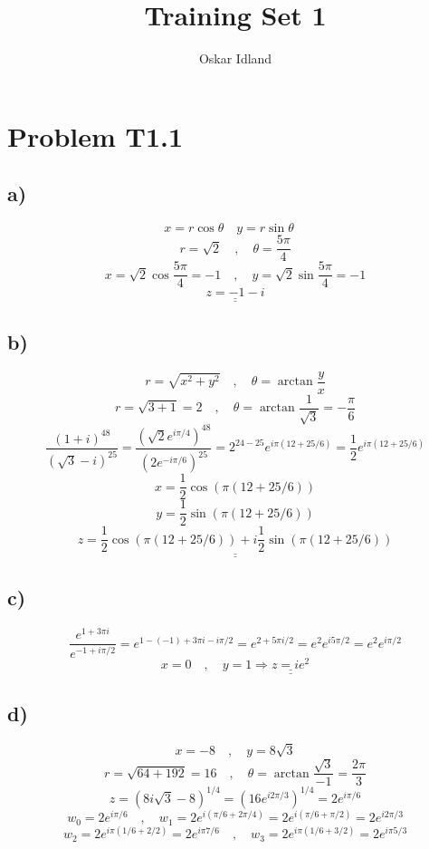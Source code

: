 \documentclass{article}
\author{Oskar Idland}
\title{Training Set 1}
\date{}
\begin{document}
\maketitle
\newpage

\section*{Problem T1.1}
\subsection*{a)}
\[
x = r \cos θ \quad y = r \sin θ \quad
\]
\[
r = \sqrt{2} \quad , \quad  θ = \frac{5π}{4}
\]
\[
x = \sqrt{2} \cos \frac{5π}{4} = -1 \quad , \quad y = \sqrt{2} \sin \frac{5π}{4} = -1
\]
\[
\underline{\underline{z = -1 - i}}
\]
 
\subsection*{b)}
\[
r = \sqrt{x^2 + y^2} \quad , \quad θ = \arctan \frac{y}{x}
\]
\[
r = \sqrt{3 + 1} = 2 \quad , \quad  θ = \arctan \frac{1}{\sqrt{3}} = -\frac{π}{6}
\]
\[
\frac{(1+i)^{48}}{(\sqrt{3}-i)^{25}} = \frac{\left(\sqrt{2}e^{iπ/4}\right)^{48}}{\left(2e^{-iπ / 6}\right)^{25}} = 2^{24 - 25} e^{iπ(12 + 25 / 6)} = \frac{1}{2} e^{iπ(12 + 25 / 6)} 
\]
\[
x = \frac{1}{2} \cos (π(12 + 25 / 6))
\]
\[
y = \frac{1}{2} \sin (π(12 + 25 / 6))
\]
\[
\underline{\underline{z = \frac{1}{2} \cos (π(12 + 25 / 6)) + i \frac{1}{2} \sin (π(12 + 25 / 6))}}
\]

\subsection*{c)}
\[
\frac{e^{1+3πi}}{e^{-1 + iπ / 2}} = e^{1 -(-1) + 3πi - iπ / 2} = e^{2 + 5πi / 2} = e^2 e^{i5π / 2} = e^2 e^{iπ / 2}
\]
\[
x = 0 \quad , \quad  y = 1 ⇒ \underline{\underline{z = ie^2}}
\]

\subsection*{d)}
\[
x = -8 \quad , \quad  y = 8\sqrt{3}
\]
\[
r = \sqrt{64 + 192} = 16 \quad , \quad  θ = \arctan \frac{\sqrt{3}}{-1} = \frac{2π}{3}
\]
\[
z = (8i\sqrt{3} - 8)^{1 / 4} = \left(16 e^{i2π / 3}\right)^{1 / 4} = 2e^{iπ / 6} 
\]
\[
w_0 = 2e^{iπ / 6} \quad , \quad   w_1 = 2e^{i(π / 6 + 2π / 4)} = 2e^{i(π / 6 + π / 2)} = 2e^{i 2π / 3}
\]
\[
w_2 = 2e^{iπ(1 / 6 + 2/2)} = 2e^{iπ 7 / 6} \quad , \quad  w_3 = 2e^{iπ (1 / 6 + 3 / 2)} = 2e^{iπ 5 / 3}
\]
\end{document}
